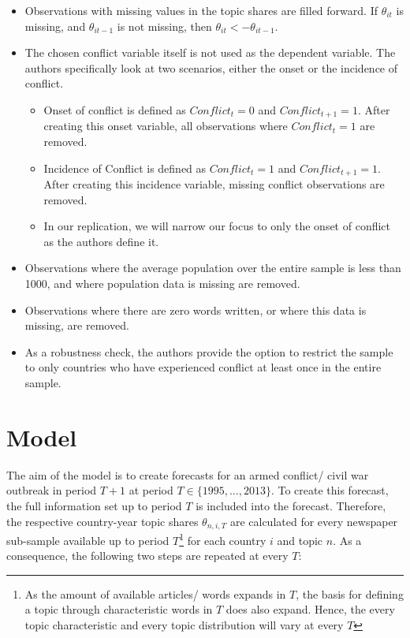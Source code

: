 \begin{itemize}
    \item Observations with missing values in the topic shares are filled forward. If $\theta_{it}$ is missing, and $\theta_{it - 1}$ is not missing, then $\theta_{it} <- \theta_{it - 1}.$
    \item The chosen conflict variable itself is not used as the dependent variable. The authors specifically look at two scenarios, either the onset or the incidence of conflict.
        \begin{itemize}
            \item Onset of conflict is defined as $Conflict_{t} = 0$ and $Conflict_{t + 1} = 1$. After creating this onset variable, all observations where $Conflict_{t} = 1$ are removed.
            \item Incidence of Conflict is defined as $Conflict_{t} = 1$ and $Conflict_{t + 1} = 1$. After creating this incidence variable, missing conflict observations are removed.
            \item In our replication, we will narrow our focus to only the onset of conflict as the authors define it.
        \end{itemize}
    \item Observations where the average population over the entire sample is less than 1000, and where population data is missing are removed.
    \item Observations where there are zero words written, or where this data is missing, are removed.
    \item As a robustness check, the authors provide the option to restrict the sample to only countries who have experienced conflict at least once in the entire sample.
\end{itemize}

\section{Model}
The aim of the model is to create forecasts for an armed conflict/ civil war outbreak in period $T+1$ at period $T \in \{1995,..., 2013\}$. To create this forecast, the full information set up to period $T$ is included into the forecast. Therefore, the respective country-year topic shares $\theta_{n,i,T}$ are calculated for every newspaper sub-sample available up to period $T$\footnote{As the amount of available articles/ words expands in $T$, the basis for defining a topic through characteristic words in $T$ does also expand. Hence, the every topic characteristic and every topic distribution will vary at every $T$} for each country $i$ and topic $n$. As a consequence, the following two steps are repeated at every $T$:

